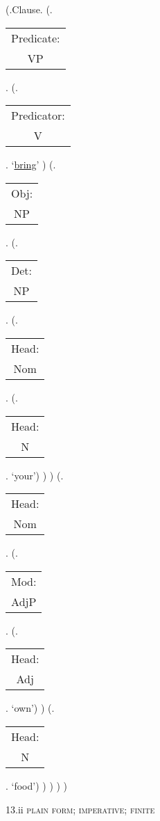 \documentclass[12pt,letterpaper]{article}
\begin{document}
\begin{figure}
	\begin{center}
		\begin{parsetree}
			(.Clause.
			(.\begin{tabular}{c}Predicate:\\VP\end{tabular}.
			(.\begin{tabular}{c}Predicator:\\V\end{tabular}.    `\underline{bring}' )
			(.\begin{tabular}{c}Obj:\\NP\end{tabular}.  
			(.\begin{tabular}{c}Det:\\NP\end{tabular}.  
			(.\begin{tabular}{c}Head:\\Nom\end{tabular}.
			(.\begin{tabular}{c}Head:\\N\end{tabular}. `your')
			)
			)
			(.\begin{tabular}{c}Head:\\Nom\end{tabular}.
			(.\begin{tabular}{c}Mod:\\AdjP\end{tabular}.
			(.\begin{tabular}{c}Head:\\Adj\end{tabular}. `own')
			)
			(.\begin{tabular}{c}Head:\\N\end{tabular}. `food')
			)
			)
			)
			)
			
		\end{parsetree}
		\hfill \break \hfill \break
		13.ii \textsc{plain form; imperative; finite}
	\end{center}
\end{figure}	
\end{document}
